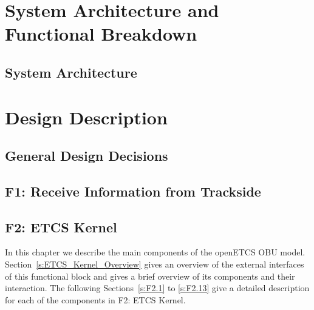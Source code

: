\documentclass[oneside]{template/openetcs_report}
\begin{document}


\mainmatter

\setlength{\topsep}{0.5ex}
\setlength{\itemsep}{0ex}
\setlength{\parsep}{0ex}



\part{System Architecture and Functional Breakdown}

%

\chapter{System Architecture}






\part{Design Description}

\chapter{General Design Decisions}




\chapter{F1: Receive Information from Trackside}\label{s:F1}




\chapter{F2: ETCS Kernel}\label{s:F2}

In this chapter we describe the main components of the openETCS OBU model. Section~\ref{s:ETCS_Kernel_Overview} gives an overview of the external interfaces of this functional block and gives a brief overview of its components and their interaction. The following Sections~\ref{s:F2.1} to \ref{s:F2.13} give a detailed description for each of the components in F2: ETCS Kernel.
\end{document}
